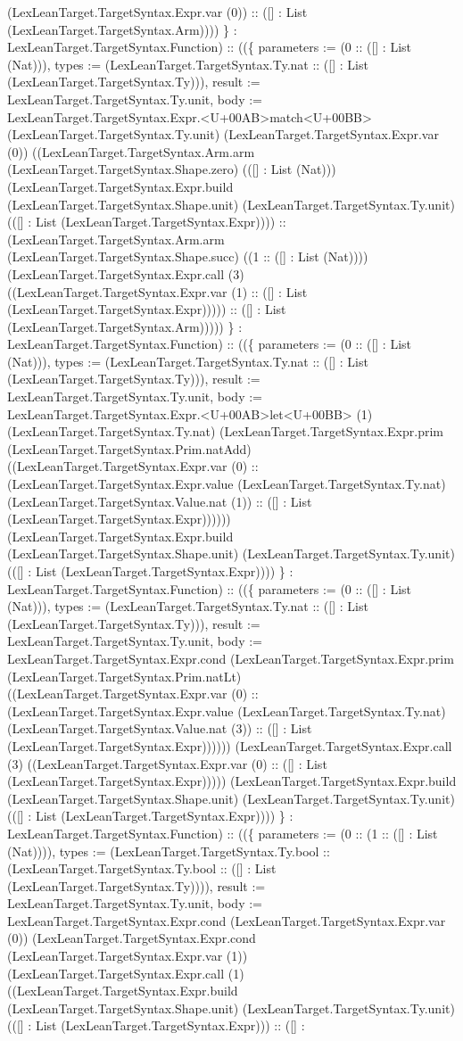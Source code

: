 \documentclass[11pt]{article}
\begin{document}
(LexLeanTarget.TargetSyntax.Expr.var (0)) :: ([] : List (LexLeanTarget.TargetSyntax.Arm)))) \} : LexLeanTarget.TargetSyntax.Function) :: ((\{ parameters := (0 :: ([] : List (Nat))), types := (LexLeanTarget.TargetSyntax.Ty.nat :: ([] : List (LexLeanTarget.TargetSyntax.Ty))), result := LexLeanTarget.TargetSyntax.Ty.unit, body := LexLeanTarget.TargetSyntax.Expr.<U+00AB>match<U+00BB> (LexLeanTarget.TargetSyntax.Ty.unit) (LexLeanTarget.TargetSyntax.Expr.var (0)) ((LexLeanTarget.TargetSyntax.Arm.arm (LexLeanTarget.TargetSyntax.Shape.zero) (([] : List (Nat))) (LexLeanTarget.TargetSyntax.Expr.build (LexLeanTarget.TargetSyntax.Shape.unit) (LexLeanTarget.TargetSyntax.Ty.unit) (([] : List (LexLeanTarget.TargetSyntax.Expr)))) :: (LexLeanTarget.TargetSyntax.Arm.arm (LexLeanTarget.TargetSyntax.Shape.succ) ((1 :: ([] : List (Nat)))) (LexLeanTarget.TargetSyntax.Expr.call (3) ((LexLeanTarget.TargetSyntax.Expr.var (1) :: ([] : List (LexLeanTarget.TargetSyntax.Expr))))) :: ([] : List (LexLeanTarget.TargetSyntax.Arm))))) \} : LexLeanTarget.TargetSyntax.Function) :: ((\{ parameters := (0 :: ([] : List (Nat))), types := (LexLeanTarget.TargetSyntax.Ty.nat :: ([] : List (LexLeanTarget.TargetSyntax.Ty))), result := LexLeanTarget.TargetSyntax.Ty.unit, body := LexLeanTarget.TargetSyntax.Expr.<U+00AB>let<U+00BB> (1) (LexLeanTarget.TargetSyntax.Ty.nat) (LexLeanTarget.TargetSyntax.Expr.prim (LexLeanTarget.TargetSyntax.Prim.natAdd) ((LexLeanTarget.TargetSyntax.Expr.var (0) :: (LexLeanTarget.TargetSyntax.Expr.value (LexLeanTarget.TargetSyntax.Ty.nat) (LexLeanTarget.TargetSyntax.Value.nat (1)) :: ([] : List (LexLeanTarget.TargetSyntax.Expr)))))) (LexLeanTarget.TargetSyntax.Expr.build (LexLeanTarget.TargetSyntax.Shape.unit) (LexLeanTarget.TargetSyntax.Ty.unit) (([] : List (LexLeanTarget.TargetSyntax.Expr)))) \} : LexLeanTarget.TargetSyntax.Function) :: ((\{ parameters := (0 :: ([] : List (Nat))), types := (LexLeanTarget.TargetSyntax.Ty.nat :: ([] : List (LexLeanTarget.TargetSyntax.Ty))), result := LexLeanTarget.TargetSyntax.Ty.unit, body := LexLeanTarget.TargetSyntax.Expr.cond (LexLeanTarget.TargetSyntax.Expr.prim (LexLeanTarget.TargetSyntax.Prim.natLt) ((LexLeanTarget.TargetSyntax.Expr.var (0) :: (LexLeanTarget.TargetSyntax.Expr.value (LexLeanTarget.TargetSyntax.Ty.nat) (LexLeanTarget.TargetSyntax.Value.nat (3)) :: ([] : List (LexLeanTarget.TargetSyntax.Expr)))))) (LexLeanTarget.TargetSyntax.Expr.call (3) ((LexLeanTarget.TargetSyntax.Expr.var (0) :: ([] : List (LexLeanTarget.TargetSyntax.Expr))))) (LexLeanTarget.TargetSyntax.Expr.build (LexLeanTarget.TargetSyntax.Shape.unit) (LexLeanTarget.TargetSyntax.Ty.unit) (([] : List (LexLeanTarget.TargetSyntax.Expr)))) \} : LexLeanTarget.TargetSyntax.Function) :: ((\{ parameters := (0 :: (1 :: ([] : List (Nat)))), types := (LexLeanTarget.TargetSyntax.Ty.bool :: (LexLeanTarget.TargetSyntax.Ty.bool :: ([] : List (LexLeanTarget.TargetSyntax.Ty)))), result := LexLeanTarget.TargetSyntax.Ty.unit, body := LexLeanTarget.TargetSyntax.Expr.cond (LexLeanTarget.TargetSyntax.Expr.var (0)) (LexLeanTarget.TargetSyntax.Expr.cond (LexLeanTarget.TargetSyntax.Expr.var (1)) (LexLeanTarget.TargetSyntax.Expr.call (1) ((LexLeanTarget.TargetSyntax.Expr.build (LexLeanTarget.TargetSyntax.Shape.unit) (LexLeanTarget.TargetSyntax.Ty.unit) (([] : List (LexLeanTarget.TargetSyntax.Expr))) :: ([] : 
\end{document}

